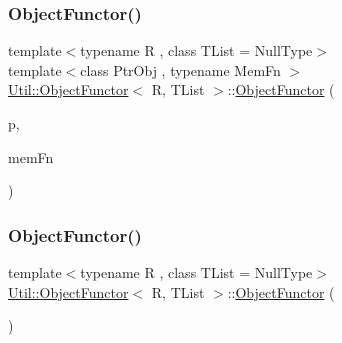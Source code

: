 \mbox{\label{classUtil_1_1ObjectFunctor_a346fdbed7070eeafec9270c9a5a766ec}} 
\subsubsection{\texorpdfstring{ObjectFunctor()}{ObjectFunctor()}\hspace{0.1cm}{\footnotesize\ttfamily [5/15]}}
{\footnotesize\ttfamily template$<$typename R , class T\+List  = Null\+Type$>$ \\
template$<$class Ptr\+Obj , typename Mem\+Fn $>$ \\
\mbox{\hyperlink{classUtil_1_1ObjectFunctor}{Util\+::\+Object\+Functor}}$<$ R, T\+List $>$\+::\mbox{\hyperlink{classUtil_1_1ObjectFunctor}{Object\+Functor}} (\begin{DoxyParamCaption}\item[{const Ptr\+Obj \&}]{p,  }\item[{Mem\+Fn}]{mem\+Fn }\end{DoxyParamCaption})\hspace{0.3cm}{\ttfamily [inline]}}

\mbox{\label{classUtil_1_1ObjectFunctor_ac08a0820c0cf21a61abb6da3ede541d4}} 
\subsubsection{\texorpdfstring{ObjectFunctor()}{ObjectFunctor()}\hspace{0.1cm}{\footnotesize\ttfamily [6/15]}}
{\footnotesize\ttfamily template$<$typename R , class T\+List  = Null\+Type$>$ \\
\mbox{\hyperlink{classUtil_1_1ObjectFunctor}{Util\+::\+Object\+Functor}}$<$ R, T\+List $>$\+::\mbox{\hyperlink{classUtil_1_1ObjectFunctor}{Object\+Functor}} (\begin{DoxyParamCaption}{ }\end{DoxyParamCaption})\hspace{0.3cm}{\ttfamily [inline]}}

